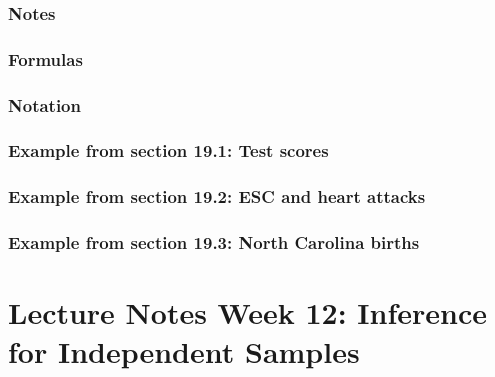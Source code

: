 \documentclass[
]{report}
\begin{document}
\hypertarget{notes-24}{%
\subsubsection*{Notes}\label{notes-24}}

\hypertarget{formulas-5}{%
\subsubsection*{Formulas}\label{formulas-5}}

\hypertarget{notation-4}{%
\subsubsection*{Notation}\label{notation-4}}

\hypertarget{example-from-section-19.1-test-scores}{%
\subsubsection*{Example from section 19.1: Test scores}\label{example-from-section-19.1-test-scores}}

\hypertarget{example-from-section-19.2-esc-and-heart-attacks}{%
\subsubsection*{Example from section 19.2: ESC and heart attacks}\label{example-from-section-19.2-esc-and-heart-attacks}}

\hypertarget{example-from-section-19.3-north-carolina-births}{%
\subsubsection*{Example from section 19.3: North Carolina births}\label{example-from-section-19.3-north-carolina-births}}

\hypertarget{lecture-notes-week-12-inference-for-independent-samples}{%
\section{Lecture Notes Week 12: Inference for Independent Samples}\label{lecture-notes-week-12-inference-for-independent-samples}}
\end{document}
